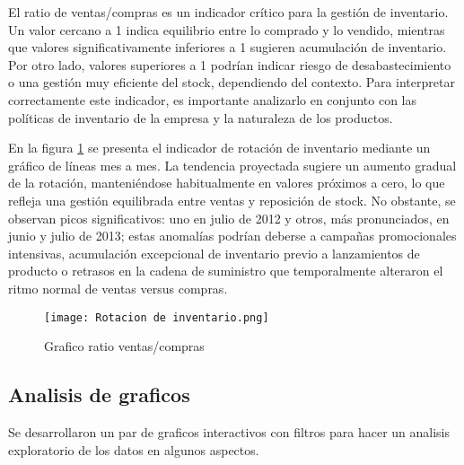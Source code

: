 \documentclass{article}
\begin{document}
El ratio de ventas/compras es un indicador crítico para la gestión de inventario. Un valor cercano a 1 indica equilibrio entre lo comprado y lo vendido, mientras que valores significativamente inferiores a 1 sugieren acumulación de inventario. Por otro lado, valores superiores a 1 podrían indicar riesgo de desabastecimiento o una gestión muy eficiente del stock, dependiendo del contexto. Para interpretar correctamente este indicador, es importante analizarlo en conjunto con las políticas de inventario de la empresa y la naturaleza de los productos.

En la figura \ref{fig:grafico-ratio-ventas-compras} se presenta el indicador de rotación de inventario mediante un gráfico de líneas mes a mes. La tendencia proyectada sugiere un aumento gradual de la rotación, manteniéndose habitualmente en valores próximos a cero, lo que refleja una gestión equilibrada entre ventas y reposición de stock. No obstante, se observan picos significativos: uno en julio de 2012 y otros, más pronunciados, en junio y julio de 2013; estas anomalías podrían deberse a campañas promocionales intensivas, acumulación excepcional de inventario previo a lanzamientos de producto o retrasos en la cadena de suministro que temporalmente alteraron el ritmo normal de ventas versus compras.

\begin{figure}
    \centering
    \texttt{[image: Rotacion de inventario.png]}
    \caption{Grafico ratio ventas/compras}
    \label{fig:grafico-ratio-ventas-compras}
\end{figure}



\subsection {Analisis de graficos}
Se desarrollaron un par de graficos interactivos con filtros para hacer un analisis exploratorio de los datos en algunos aspectos.
\end{document}
